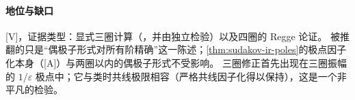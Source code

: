\paragraph{地位与缺口}[V]，证据类型：显式三圈计算（\cite{Almelid:2015jia}，并由\cite{Henn:2016jdu}独立检验）以及四圈的 Regge 论证\cite{Caron-Huot:2013fea}。
被推翻的只是“偶极子形式对所有阶精确”这一陈述；\cref{thm:sudakov-ir-poles}的极点因子化本身（[A]）与两圈以内的偶极子形式不受影响。
三圈修正首先出现在三圈振幅的 $1/\varepsilon$ 极点中；它与类时共线极限相容（严格共线因子化得以保持），这是一个非平凡的检验。
